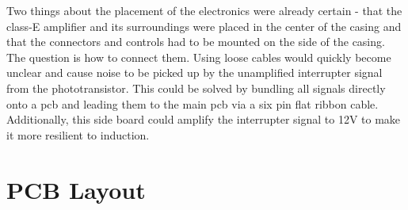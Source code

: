 Two things about the placement of the electronics were already certain - that the class-E amplifier and its surroundings were placed in the center of the casing and that the connectors and controls had to be mounted on the side of the casing. The question is how to connect them. Using loose cables would quickly become unclear and cause noise to be picked up by the unamplified interrupter signal from the phototransistor. This could be solved by bundling all signals directly onto a \gls{pcb} and leading them to the main \gls{pcb} via a six pin flat ribbon cable. Additionally, this side board could amplify the interrupter signal to 12V to make it more resilient to induction. 



\section{PCB Layout}

